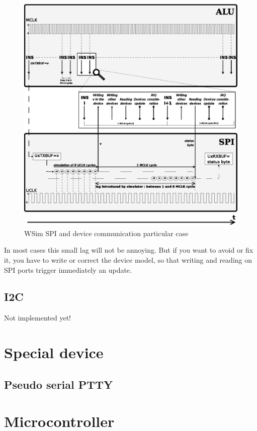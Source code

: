 \documentclass[a4paper,10pt]{report}
\begin{document}
\begin{figure}[!h]
\begin{center}
  \includegraphics[scale=1]{figures/wsim_spi.eps}
\end{center}
\caption{WSim SPI and device communication particular case}
\label{wsim spi communication}
\end{figure}

In most cases this small lag will not be annoying. But if you want to avoid or fix it, you have to write or correct the device model, so that writing and reading on SPI ports trigger immediately an update.


\subsection{I2C}
Not implemented yet!

\section{Special device}
\subsection{Pseudo serial PTTY}


\section{Microcontroller}
\end{document}
